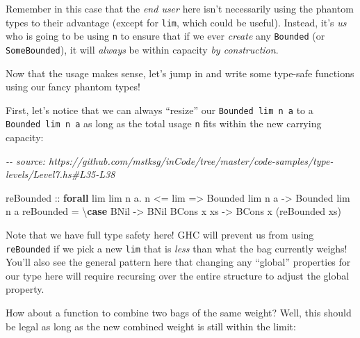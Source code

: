 \documentclass[]{article}
\newenvironment{Shaded}{}{}
\newcommand{\CommentTok}[1]{\textcolor[rgb]{0.38,0.63,0.69}{\textit{#1}}}
\newcommand{\DataTypeTok}[1]{\textcolor[rgb]{0.56,0.13,0.00}{#1}}
\newcommand{\KeywordTok}[1]{\textcolor[rgb]{0.00,0.44,0.13}{\textbf{#1}}}
\newcommand{\NormalTok}[1]{#1}
\newcommand{\OperatorTok}[1]{\textcolor[rgb]{0.40,0.40,0.40}{#1}}
\newcommand{\OtherTok}[1]{\textcolor[rgb]{0.00,0.44,0.13}{#1}}
\begin{document}
Remember in this case that the \emph{end user} here isn't necessarily using the
phantom types to their advantage (except for \texttt{lim}, which could be
useful). Instead, it's \emph{us} who is going to be using \texttt{n} to ensure
that if we ever \emph{create} any \texttt{Bounded} (or \texttt{SomeBounded}), it
will \emph{always} be within capacity \emph{by construction}.

Now that the usage makes sense, let's jump in and write some type-safe functions
using our fancy phantom types!

First, let's notice that we can always ``resize'' our
\texttt{Bounded\ lim\ n\ a} to a \texttt{Bounded\ lim\textquotesingle{}\ n\ a}
as long as the total usage \texttt{n} fits within the new carrying capacity:

\begin{Shaded}
\begin{Highlighting}[]
\CommentTok{{-}{-} source: https://github.com/mstksg/inCode/tree/master/code{-}samples/type{-}levels/Level7.hs\#L35{-}L38}

\OtherTok{reBounded ::} \KeywordTok{forall}\NormalTok{ lim lim\textquotesingle{} n a}\OperatorTok{.}\NormalTok{ n }\OperatorTok{\textless{}=}\NormalTok{ lim\textquotesingle{} }\OtherTok{=\textgreater{}} \DataTypeTok{Bounded}\NormalTok{ lim n a }\OtherTok{{-}\textgreater{}} \DataTypeTok{Bounded}\NormalTok{ lim\textquotesingle{} n a}
\NormalTok{reBounded }\OtherTok{=}\NormalTok{ \textbackslash{}}\KeywordTok{case}
  \DataTypeTok{BNil} \OtherTok{{-}\textgreater{}} \DataTypeTok{BNil}
  \DataTypeTok{BCons}\NormalTok{ x xs }\OtherTok{{-}\textgreater{}} \DataTypeTok{BCons}\NormalTok{ x (reBounded xs)}
\end{Highlighting}
\end{Shaded}

Note that we have full type safety here! GHC will prevent us from using
\texttt{reBounded} if we pick a new \texttt{lim} that is \emph{less} than what
the bag currently weighs! You'll also see the general pattern here that changing
any ``global'' properties for our type here will require recursing over the
entire structure to adjust the global property.

How about a function to combine two bags of the same weight? Well, this should
be legal as long as the new combined weight is still within the limit:
\end{document}
